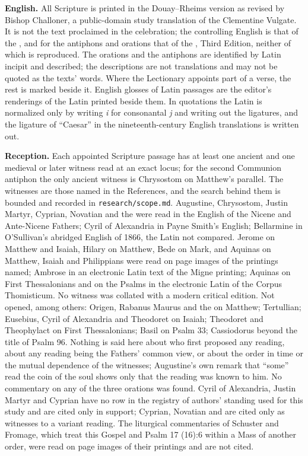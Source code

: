 {\textbf{English.} All Scripture is printed in the Douay--Rheims version as
revised by Bishop Challoner, a public-domain study translation of the
Clementine Vulgate. It is not the text proclaimed in the celebration; the
controlling English is that of the , and for the antiphons and orations
that of the , Third Edition, neither of which is reproduced.
The orations and the antiphons are identified by Latin incipit and described;
the descriptions are not translations and may not be quoted as the texts'
words. Where the Lectionary appoints part of a verse, the rest is marked
beside it. English glosses of Latin passages are the editor's renderings of the
Latin printed beside them. In quotations the Latin is normalized only by
writing \textit{i} for consonantal \textit{j} and writing out the ligatures,
and the ligature of ``Caesar'' in the nineteenth-century English translations
is written out.

\textbf{Reception.} Each appointed Scripture passage has at least one ancient
and one medieval or later witness read at an exact locus; for the second
Communion antiphon the only ancient witness is Chrysostom on Matthew's
parallel. The witnesses are those named in the References, and the search
behind them is bounded and recorded in \texttt{research/scope.md}. Augustine,
Chrysostom, Justin Martyr, Cyprian, Novatian and the  were read in the English of the Nicene and Ante-Nicene Fathers;
Cyril of Alexandria in Payne Smith's English; Bellarmine in O'Sullivan's
abridged English of 1866, the Latin not compared. Jerome on Matthew and
Isaiah, Hilary on Matthew, Bede on Mark, and Aquinas on Matthew, Isaiah and
Philippians were read on page images of the printings named; Ambrose in an
electronic Latin text of the Migne printing; Aquinas on First Thessalonians and
on the Psalms in the electronic Latin of the Corpus Thomisticum. No witness
was collated with a modern critical edition. Not opened, among others: Origen,
Rabanus Maurus and the  on Matthew; Tertullian; Eusebius,
Cyril of Alexandria and Theodoret on Isaiah; Theodoret and Theophylact on
First Thessalonians; Basil on Psalm 33; Cassiodorus beyond the title of
Psalm 96. Nothing is said here about who first proposed any reading, about any
reading being the Fathers' common view, or about the order in time or the
mutual dependence of the witnesses; Augustine's own remark that ``some'' read
the coin of the soul shows only that the reading was known to him. No
commentary on any of the three orations was found. Cyril of Alexandria,
Justin Martyr and Cyprian have no row in the registry of authors' standing
used for this study and are cited only in support; Cyprian, Novatian and
 are cited only as witnesses to a variant reading. The
liturgical commentaries of Schuster and Fromage, which treat this Gospel and
Psalm 17 (16):6 within a Mass of another order, were read on page images of
their printings and are not cited.

}
